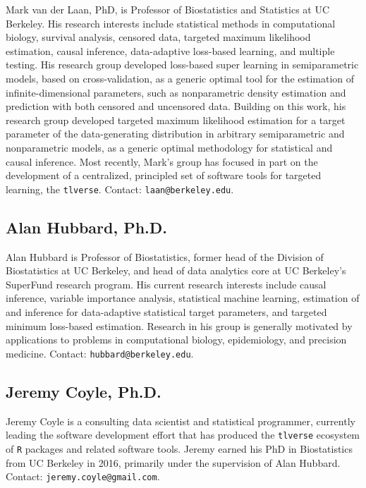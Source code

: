 \documentclass[a4paper,11pt]{texMemo}
\begin{document}
Mark van der Laan, PhD, is Professor of Biostatistics and Statistics at UC
Berkeley. His research interests include statistical methods in computational
biology, survival analysis, censored data, targeted maximum likelihood
estimation, causal inference, data-adaptive loss-based learning, and multiple
testing. His research group developed loss-based super learning in
semiparametric models, based on cross-validation, as a generic optimal tool for
the estimation of infinite-dimensional parameters, such as nonparametric density
estimation and prediction with both censored and uncensored data. Building on
this work, his research group developed targeted maximum likelihood estimation
for a target parameter of the data-generating distribution in arbitrary
semiparametric and nonparametric models, as a generic optimal methodology for
statistical and causal inference. Most recently, Mark's group has focused in
part on the development of a centralized, principled set of software tools for
targeted learning, the \texttt{tlverse}. Contact: \texttt{laan@berkeley.edu}.

\subsection{Alan Hubbard, Ph.D.}

Alan Hubbard is Professor of Biostatistics, former head of the Division of
Biostatistics at UC Berkeley, and head of data analytics core at UC Berkeley's
SuperFund research program. His current research interests include causal
inference, variable importance analysis, statistical machine learning,
estimation of and inference for data-adaptive statistical target parameters, and
targeted minimum loss-based estimation. Research in his group is generally
motivated by applications to problems in computational biology, epidemiology,
and precision medicine. Contact: \texttt{hubbard@berkeley.edu}.

\subsection{Jeremy Coyle, Ph.D.}

Jeremy Coyle is a consulting data scientist and statistical programmer,
currently leading the software development effort that has produced the
\texttt{tlverse} ecosystem of \texttt{R} packages and related software tools.
Jeremy earned his PhD in Biostatistics from UC Berkeley in 2016, primarily under
the supervision of Alan Hubbard. Contact: \texttt{jeremy.coyle@gmail.com}.
\end{document}

